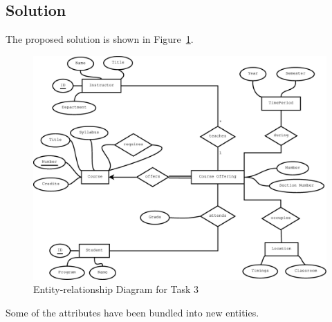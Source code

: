 \subsection{Solution}
The proposed solution is shown in Figure~\ref{fig:task3}.

\begin{figure}[htbp]
  \centering
  \includegraphics[width=\linewidth]{include/task3.eps}
    \caption{Entity-relationship Diagram for Task 3}
  \label{fig:task3}
\end{figure}

Some of the attributes have been bundled into new entities.
